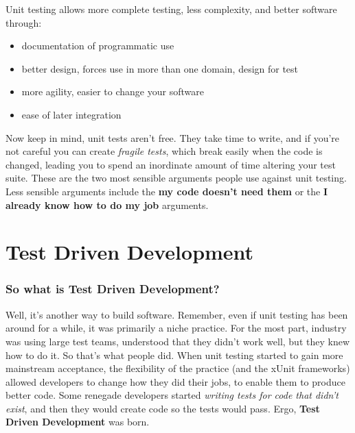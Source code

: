 \documentclass[t, 10pt]{beamer}
\begin{document}
\begin{frame}
Unit testing allows more complete testing, less complexity, and better software through:
\begin{itemize}
\item documentation of programmatic use
\item better design, forces use in more than one domain, design for test
\item more agility, easier to change your software
\item ease of later integration
\end{itemize}
Now keep in mind, unit tests aren't free.
\newline
\newline
They take time to write, and if you're not careful you can create \textit{fragile tests}, which break easily when the code is changed, leading you to spend an inordinate amount of time altering your test suite.  These are the two most sensible arguments people use against unit testing.  Less sensible arguments include the \textbf{my code doesn't need them} or the \textbf{I already know how to do my job} arguments.
\end{frame}

\section{Test Driven Development}

\begin{frame}
\frametitle{So what is Test Driven Development?}
Well, it's another way to build software.
\newline
\newline
Remember, even if unit testing has been around for a while, it was primarily a niche practice.  For the most part, industry was using large test teams, understood that they didn't work well, but they knew how to do it.  So that's what people did.  When unit testing started to gain more mainstream acceptance, the flexibility of the practice (and the xUnit frameworks) allowed developers to change how they did their jobs, to enable them to produce better code.
\newline
\newline
Some renegade developers started \textit{writing tests for code that didn't exist}, and then they would create code so the tests would pass.
\newline
\newline
Ergo, \textbf{Test Driven Development} was born.
\end{frame}
\end{document}
